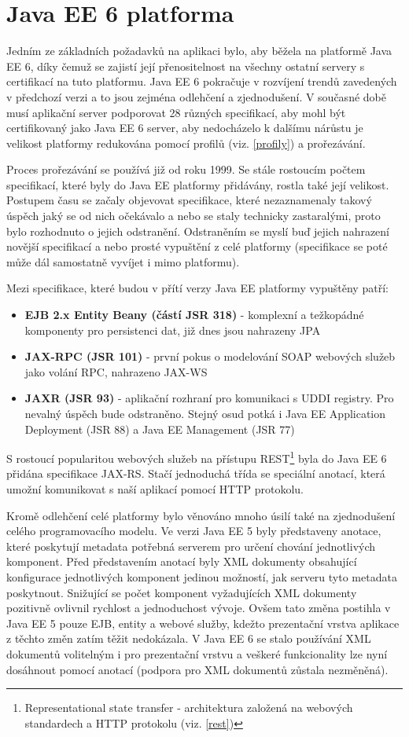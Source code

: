 \documentclass[122pt,oneside]{fithesis}
\begin{document}
\section{Java EE 6 platforma}
Jedním ze základních požadavků na aplikaci bylo, aby běžela na platformě Java EE 6, díky čemuž se zajistí její přenositelnost na všechny ostatní servery s certifikací na tuto platformu. Java EE 6 pokračuje v rozvíjení trendů zavedených v předchozí verzi a to jsou zejména odlehčení a zjednodušení. V současné době musí aplikační server podporovat 28 různých specifikací, aby mohl být certifikovaný jako Java EE 6 server, aby nedocházelo k dalšímu nárůstu je velikost platformy redukována pomocí profilů (viz. \ref{profily}) a prořezávání. 

Proces prořezávání se používá již od roku 1999. Se stále rostoucím počtem specifikací, které byly do Java EE platformy přidávány, rostla také její velikost. Postupem času se začaly objevovat specifikace, které nezaznamenaly takový úspěch jaký se od nich očekávalo a nebo se staly technicky zastaralými, proto bylo rozhodnuto o jejich odstranění. Odstraněním se myslí buď jejich nahrazení novější specifikací a nebo prosté vypuštění z celé platformy (specifikace se poté může dál samostatně vyvíjet i mimo platformu).

Mezi specifikace, které budou v přítí verzy Java EE platformy vypuštěny patří:
\begin{itemize}
  \item {\bf EJB 2.x Entity Beany (částí JSR 318)} - komplexní a težkopádné komponenty pro persistenci dat, již dnes jsou nahrazeny JPA
  \item {\bf JAX-RPC (JSR 101)} - první pokus o modelování SOAP webových služeb jako volání RPC, nahrazeno JAX-WS
  \item {\bf JAXR (JSR 93)} - aplikační rozhraní pro komunikaci s UDDI registry. Pro nevalný úspěch bude odstraněno. Stejný osud potká i Java EE Application Deployment (JSR 88) a Java EE Management (JSR 77)
\end{itemize}

S rostoucí popularitou webových služeb na přístupu REST\footnote{Representational state transfer - architektura založená na webových standardech a HTTP protokolu (viz. \ref{rest})} byla do Java EE 6 přidána specifikace JAX-RS. Stačí jednoduchá třída se speciální anotací, která umožní komunikovat s naší aplikací pomocí HTTP protokolu.

Kromě odlehčení celé platformy bylo věnováno mnoho úsilí také na zjednodušení celého programovacího modelu. Ve verzi Java EE 5 byly představeny anotace, které poskytují metadata potřebná serverem pro určení chování jednotlivých komponent. Před představením anotací byly XML dokumenty obsahující konfigurace jednotlivých komponent jedinou možností, jak serveru tyto metadata poskytnout. Snižující se počet komponent vyžadujících XML dokumenty pozitivně ovlivnil rychlost a jednoduchost vývoje. Ovšem tato změna postihla v Java EE 5 pouze EJB, entity a webové služby, kdežto prezentační vrstva aplikace z těchto změn zatím těžit nedokázala. V Java EE 6 se stalo používání XML dokumentů volitelným i pro prezentační vrstvu a veškeré funkcionality lze nyní dosáhnout pomocí anotací (podpora pro XML dokumentů zůstala nezměněná).
\end{document}
